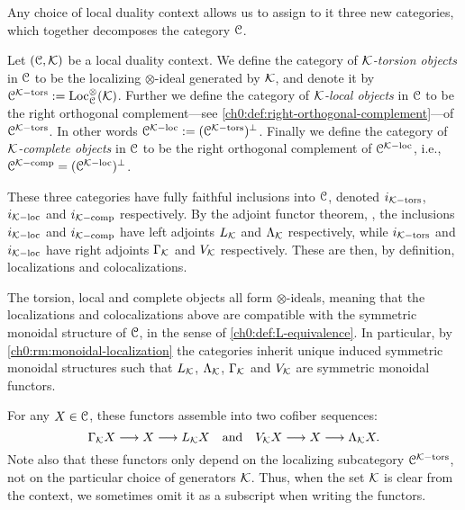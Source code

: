 Any choice of local duality context allows us to assign to it three new categories, which together decomposes the category $\EuScript{C}$. 

\begin{construction}
    \label{ch0:const:local-duality-categories}
    Let $(\EuScript{C}, \mathcal{K})$ be a local duality context. We define the category of \emph{$\mathcal{K}$-torsion objects} in $\EuScript{C}$ to be the localizing $\otimes$-ideal generated by $\mathcal{K}$, and denote it by $\EuScript{C}^{\mathcal{K}-\mathrm{tors}}:= \operatorname{Loc}_{\EuScript{C}}^\otimes(\mathcal{K})$. Further we define the category of \emph{$\mathcal{K}$-local objects} in $\EuScript{C}$ to be the right orthogonal complement---see \cref{ch0:def:right-orthogonal-complement}---of $\EuScript{C}^{\mathcal{K}-\mathrm{tors}}$. In other words $\EuScript{C}^{\mathcal{K}-\mathrm{loc}} := (\EuScript{C}^{\mathcal{K}-\mathrm{tors}})^\perp$. Finally we define the category of \emph{$\mathcal{K}$-complete objects} in $\EuScript{C}$ to be the right orthogonal complement of $\EuScript{C}^{\mathcal{K}-\mathrm{loc}}$, i.e., $\EuScript{C}^{\mathcal{K}-\mathrm{comp}}= (\EuScript{C}^{\mathcal{K}-\mathrm{loc}})^\perp$. 
    
    These three categories have fully faithful inclusions into $\EuScript{C}$, denoted $i_{\mathcal{K}-\mathrm{tors}}$, $i_{\mathcal{K}-\mathrm{loc}}$ and $i_{\mathcal{K}-\mathrm{comp}}$ respectively. By the adjoint functor theorem, \cite[5.5.2.9]{lurie_09}, the inclusions $i_{\mathcal{K}-\mathrm{loc}}$ and $i_{\mathcal{K}-\mathrm{comp}}$ have left adjoints $L_{\mathcal{K}}$ and $\Lambda_{\mathcal{K}}$ respectively, while $i_{\mathcal{K}-\mathrm{tors}}$ and $i_{\mathcal{K}-\mathrm{loc}}$ have right adjoints $\Gamma_{\mathcal{K}}$ and $V_{\mathcal{K}}$ respectively. These are then, by definition, localizations and colocalizations. 
    
    The torsion, local and complete objects all form $\otimes$-ideals, meaning that the localizations and colocalizations above are compatible with the symmetric monoidal structure of $\EuScript{C}$, in the sense of \cref{ch0:def:L-equivalence}. In particular, by \cref{ch0:rm:monoidal-localization} the categories inherit unique induced symmetric monoidal structures such that $L_{\mathcal{K}}$, $\Lambda_{\mathcal{K}}$, $\Gamma_{\mathcal{K}}$ and $V_{\mathcal{K}}$ are symmetric monoidal functors. 

    For any $X\in \EuScript{C}$, these functors assemble into two cofiber sequences:
    \[\Gamma_{\mathcal{K}} X \longrightarrow X \longrightarrow L_{\mathcal{K}} X \quad \text{and}\quad V_{\mathcal{K}} X \longrightarrow X \longrightarrow \Lambda_{\mathcal{K}} X.\]
    Note also that these functors only depend on the localizing subcategory $\EuScript{C}^{\mathcal{K}-\mathrm{tors}}$, not on the particular choice of generators $\mathcal{K}$. Thus, when the set $\mathcal{K}$ is clear from the context, we sometimes omit it as a subscript when writing the functors. 
\end{construction}

